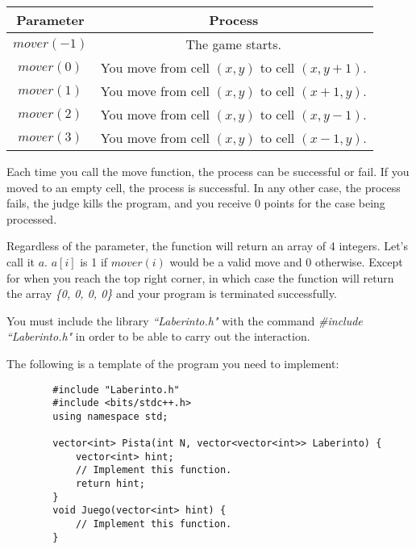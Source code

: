 \documentclass[12pt]{scrartcl}
\begin{document}
    \begin{center}
        \begin{tabular}{|c|c|}
            \hline
            {\bfseries Parameter} & {\bfseries Process}\\
            \hline
             $mover(-1)$ & The game starts. \\
             \hline
             $mover(0)$ &  You move from cell $(x, y)$ to cell $(x, y + 1)$. \\
             \hline
             $mover(1)$ & You move from cell $(x, y)$ to cell $(x + 1, y)$.\\
             \hline
             $mover(2)$ & You move from cell $(x, y)$ to cell $(x, y - 1)$.\\
             \hline
             $mover(3)$ & You move from cell $(x, y)$ to cell $(x - 1, y)$.\\
             \hline
        \end{tabular}
    \end{center}

    Each time you call the move function, the process can be successful or fail. If you moved to an empty cell, the process is successful. In any other case, the process fails, the judge kills the program, and you receive 0 points for the case being processed. 
    
    Regardless of the parameter, the function will return an array of 4 integers. Let's call it $a$. $a[i]$ is 1 if $mover(i)$ would be a valid move and 0 otherwise. Except for when you reach the top right corner, in which case the function will return the array \textit{\{0, 0, 0, 0\}} and your program is terminated successfully.

    You must include the library \textit{``Laberinto.h"} with the command \textit{\#include ``Laberinto.h"} in order to be able to carry out the interaction.
    
    The following is a template of the program you need to implement:
    
    \begin{verbatim}
        #include "Laberinto.h"
        #include <bits/stdc++.h>
        using namespace std;
        
        vector<int> Pista(int N, vector<vector<int>> Laberinto) {
            vector<int> hint;
            // Implement this function.
            return hint;
        }
        void Juego(vector<int> hint) {
            // Implement this function.
        }
        
    \end{verbatim}
\end{document}
